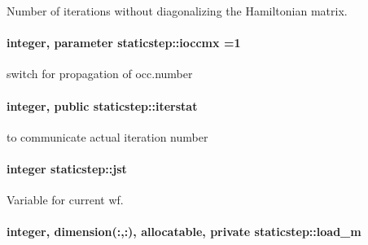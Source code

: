 Number of iterations without diagonalizing the Hamiltonian matrix. 

\paragraph[{\texorpdfstring{ioccmx}{ioccmx}}]{\setlength{\rightskip}{0pt plus 5cm}integer, parameter staticstep\+::ioccmx =1\hspace{0.3cm}{\ttfamily [private]}}\hypertarget{namespacestaticstep_a397d9c54d15061e7cfec64610233bdac}{}\label{namespacestaticstep_a397d9c54d15061e7cfec64610233bdac}


switch for propagation of occ.\+number 

\paragraph[{\texorpdfstring{iterstat}{iterstat}}]{\setlength{\rightskip}{0pt plus 5cm}integer, public staticstep\+::iterstat}\hypertarget{namespacestaticstep_a86d905176be26dd2e3298e4a93df1195}{}\label{namespacestaticstep_a86d905176be26dd2e3298e4a93df1195}


to communicate actual iteration number 

\paragraph[{\texorpdfstring{jst}{jst}}]{\setlength{\rightskip}{0pt plus 5cm}integer staticstep\+::jst\hspace{0.3cm}{\ttfamily [private]}}\hypertarget{namespacestaticstep_a9aa7dee4efe93fca07853f6989b2f045}{}\label{namespacestaticstep_a9aa7dee4efe93fca07853f6989b2f045}


Variable for current wf. 

\paragraph[{\texorpdfstring{load\+\_\+m}{load_m}}]{\setlength{\rightskip}{0pt plus 5cm}integer, dimension(\+:,\+:), allocatable, private staticstep\+::load\+\_\+m\hspace{0.3cm}{\ttfamily [private]}}\hypertarget{namespacestaticstep_a87b0a1d8427decf30e957bb3f16b0d37}{}\label{namespacestaticstep_a87b0a1d8427decf30e957bb3f16b0d37}


